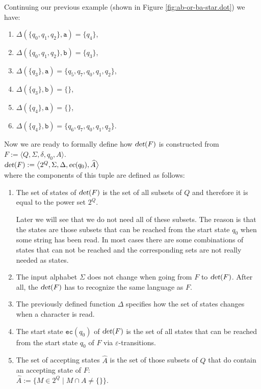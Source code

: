 \exampleEng
Continuing our previous example (shown in Figure \ref{fig:ab-or-ba-star.dot}) we have:
\begin{enumerate}
\item $\Delta(\{q_0, q_1, q_2\}, \texttt{a}) = \{ q_4 \}$,
\item $\Delta(\{q_0, q_1, q_2\}, \texttt{b}) = \{ q_3 \}$,
\item $\Delta(\{ q_3 \}, \texttt{a}) = \{ q_5, q_7, q_0, q_1, q_2 \}$,
\item $\Delta(\{ q_3 \}, \texttt{b}) = \{ \}$,
\item $\Delta(\{ q_4 \}, \texttt{a}) = \{ \}$,
\item $\Delta(\{ q_4 \}, \texttt{b}) = \{ q_6, q_7, q_0, q_1, q_2 \}$.
      \eox
\end{enumerate}
Now we are ready to formally define how $\textsl{det}(F)$ is constructed from $F := \bigl\langle Q, \Sigma, \delta, q_0, A \bigr\rangle$.
\\[0.2cm]
\hspace*{1.3cm}
$\textsl{det}(F) := \bigl\langle 2^Q, \Sigma, \Delta, \textsl{ec}(q_0), \widehat{A} \bigr\rangle$
\\[0.2cm]
where the components of this tuple are defined as follows:
\begin{enumerate}
\item The set of states of $\textsl{det}(F)$ is the set of all subsets of $Q$ and therefore it is equal to the power set
      $2^Q$.

      Later we will see that we do not need all of these subsets.
      The reason is that the states are those subsets that can be reached from the start state $q_0$ 
      when some string has been read.  In most cases there are some combinations of states that can not be reached
      and the corresponding sets are not really needed as states.
\item The input alphabet $\Sigma$ does not change when going from $F$ to $\textsl{det}(F)$.
      After all, the $\textsl{det}(F)$ has to recognize the same language as $F$.
\item The previously defined function $\Delta$ specifies how the set of states changes when a
      character is read.
\item The start state $\texttt{ec}(q_0)$ of $\textsl{det}(F)$ is the set of all states
      that can be reached from the start state $q_0$ of $F$ via $\varepsilon$-transitions.
\item The set of accepting states $\widehat{A}$ is the set of those subsets of $Q$ that do contain an accepting
      state of $F$:
      \\[0.2cm]
      \hspace*{1.3cm}
      $\widehat{A} := \bigl\{ M \in 2^Q \mid M \cap A \not= \{\} \bigl\}$.
\end{enumerate}

